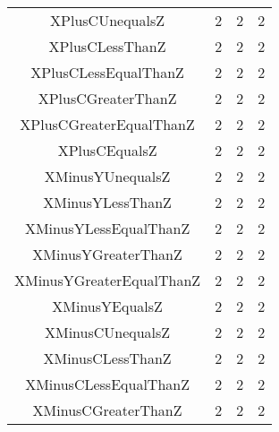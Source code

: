 \begin{table}
\begin{center}
\begin{tabular}{c|c|c|c}
XPlusCUnequalsZ                                        &           2       &           2       &           2             \\
XPlusCLessThanZ                                        &           2       &           2       &           2             \\
XPlusCLessEqualThanZ                                   &           2       &           2       &           2             \\
XPlusCGreaterThanZ                                     &           2       &           2       &           2             \\
XPlusCGreaterEqualThanZ                                &           2       &           2       &           2             \\
XPlusCEqualsZ                                          &           2       &           2       &           2             \\
XMinusYUnequalsZ                                       &           2       &           2       &           2             \\
XMinusYLessThanZ                                       &           2       &           2       &           2             \\
XMinusYLessEqualThanZ                                  &           2       &           2       &           2             \\
XMinusYGreaterThanZ                                    &           2       &           2       &           2             \\
XMinusYGreaterEqualThanZ                               &           2       &           2       &           2             \\
XMinusYEqualsZ                                         &           2       &           2       &           2             \\
XMinusCUnequalsZ                                       &           2       &           2       &           2             \\
XMinusCLessThanZ                                       &           2       &           2       &           2             \\
XMinusCLessEqualThanZ                                  &           2       &           2       &           2             \\
XMinusCGreaterThanZ                                    &           2       &           2       &           2             \\

\end{tabular}
\end{center}
\end{table}
